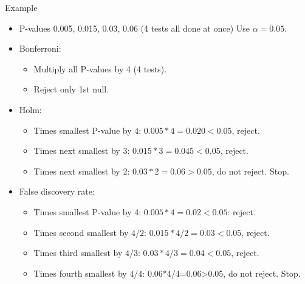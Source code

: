\documentclass[unknownkeysallowed]{beamer}\usepackage[]{graphicx}\usepackage[]{color}
\begin{document}
\begin{frame}[fragile]{Example}
  
  \begin{itemize}
  \item P-values 0.005, 0.015, 0.03, 0.06 (4 tests all done at once)
Use $\alpha=0.05$.

\item Bonferroni: 
  \begin{itemize}
  \item 
Multiply all P-values by 4 (4 tests).
\item 
Reject only 1st null.
  \end{itemize}

\item Holm: 
  \begin{itemize}
  \item 
Times smallest P-value by 4: $0.005*4=0.020<0.05$, reject.
\item 
Times next smallest by 3: $0.015*3=0.045<0.05$, reject.
\item Times next smallest by 2: $0.03*2=0.06>0.05$, do not reject. Stop.
  \end{itemize}

\item False discovery rate:
  \begin{itemize}
  \item Times smallest P-value by 4: $0.005*4=0.02<0.05$: reject.
\item Times second smallest by $4/2$: $0.015*4/2=0.03<0.05$, reject.
\item Times third smallest by $4/3$: $0.03*4/3=0.04<0.05$, reject.
\item Times fourth smallest by $4/4$: 0.06*4/4=0.06>0.05, do not reject. Stop.
  \end{itemize}
  \end{itemize}

\end{frame}
\end{document}
